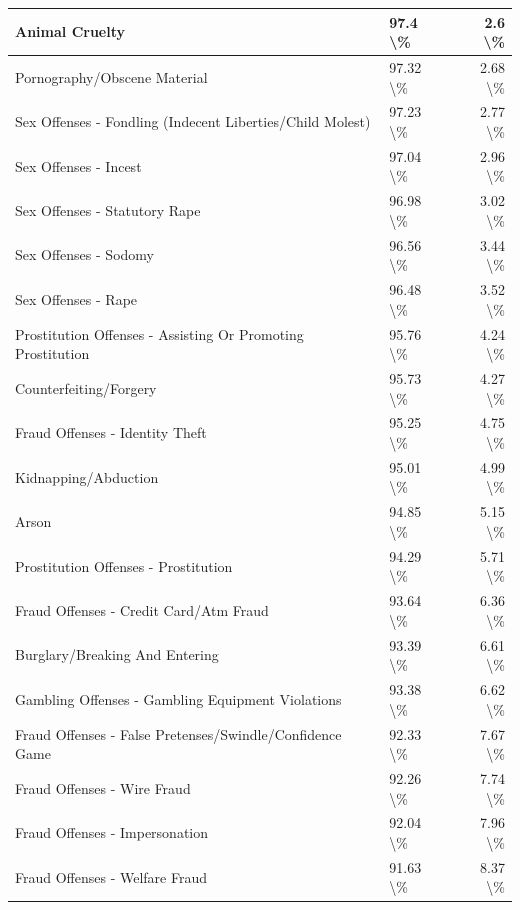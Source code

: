 \documentclass[
]{krantz}
\begin{document}
\begin{longtable}[t]{l|l|r}
\hline
Animal Cruelty & 97.4 \textbackslash{}\% & 2.6 \textbackslash{}\%\\
\hline
Pornography/Obscene Material & 97.32 \textbackslash{}\% & 2.68 \textbackslash{}\%\\
\hline
Sex Offenses - Fondling (Indecent Liberties/Child Molest) & 97.23 \textbackslash{}\% & 2.77 \textbackslash{}\%\\
\hline
Sex Offenses - Incest & 97.04 \textbackslash{}\% & 2.96 \textbackslash{}\%\\
\hline
Sex Offenses - Statutory Rape & 96.98 \textbackslash{}\% & 3.02 \textbackslash{}\%\\
\hline
Sex Offenses - Sodomy & 96.56 \textbackslash{}\% & 3.44 \textbackslash{}\%\\
\hline
Sex Offenses - Rape & 96.48 \textbackslash{}\% & 3.52 \textbackslash{}\%\\
\hline
Prostitution Offenses - Assisting Or Promoting Prostitution & 95.76 \textbackslash{}\% & 4.24 \textbackslash{}\%\\
\hline
Counterfeiting/Forgery & 95.73 \textbackslash{}\% & 4.27 \textbackslash{}\%\\
\hline
Fraud Offenses - Identity Theft & 95.25 \textbackslash{}\% & 4.75 \textbackslash{}\%\\
\hline
Kidnapping/Abduction & 95.01 \textbackslash{}\% & 4.99 \textbackslash{}\%\\
\hline
Arson & 94.85 \textbackslash{}\% & 5.15 \textbackslash{}\%\\
\hline
Prostitution Offenses - Prostitution & 94.29 \textbackslash{}\% & 5.71 \textbackslash{}\%\\
\hline
Fraud Offenses - Credit Card/Atm Fraud & 93.64 \textbackslash{}\% & 6.36 \textbackslash{}\%\\
\hline
Burglary/Breaking And Entering & 93.39 \textbackslash{}\% & 6.61 \textbackslash{}\%\\
\hline
Gambling Offenses - Gambling Equipment Violations & 93.38 \textbackslash{}\% & 6.62 \textbackslash{}\%\\
\hline
Fraud Offenses - False Pretenses/Swindle/Confidence Game & 92.33 \textbackslash{}\% & 7.67 \textbackslash{}\%\\
\hline
Fraud Offenses - Wire Fraud & 92.26 \textbackslash{}\% & 7.74 \textbackslash{}\%\\
\hline
Fraud Offenses - Impersonation & 92.04 \textbackslash{}\% & 7.96 \textbackslash{}\%\\
\hline
Fraud Offenses - Welfare Fraud & 91.63 \textbackslash{}\% & 8.37 \textbackslash{}\%\\

\end{longtable}
\end{document}
